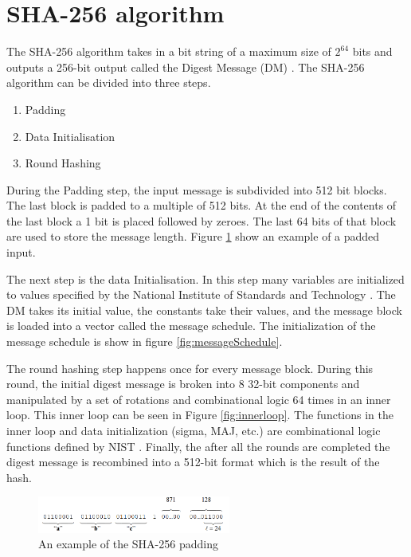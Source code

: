 \documentclass[conference]{IEEEtran}
\begin{document}
\section{SHA-256 algorithm} \label{sha256}
The SHA-256 algorithm takes in a bit string of a maximum size of $2^{64}$ bits and outputs a 256-bit output called the Digest Message (DM) \cite{nist}. The SHA-256 algorithm can be divided into three steps.
\begin{enumerate}
  \item Padding
  \item Data Initialisation
  \item Round Hashing
\end{enumerate}

During the Padding step, the input message is subdivided into 512 bit blocks. The last block is padded to a multiple of 512 bits. At the end of the contents of the last block a 1 bit is placed followed by zeroes. The last 64 bits of that block are used to store the message length. Figure \ref{fig:pad} show an example of a padded input. 

The next step is the data Initialisation. In this step many variables are initialized to values specified by the National Institute of Standards and Technology \cite{nist}. The DM takes its initial value, the constants take their values, and the message block is loaded into a vector called the message schedule. The initialization of the message schedule is show in figure \ref{fig:messageSchedule}. 

The round hashing step happens once for every message block. During this round, the initial digest message is broken into 8 32-bit components and manipulated by a set of rotations and combinational logic 64 times in an inner loop. This inner loop can be seen in Figure \ref{fig:innerloop}. The functions in the inner loop and data initialization (sigma, MAJ, etc.) are combinational logic functions defined by NIST \cite{nist}. Finally, the after all the rounds are completed the digest message is recombined into a 512-bit format which is the result of the hash.

\begin{figure}[!t]
\centering
\includegraphics[width=2.5in]{padding}
\caption{An example of the SHA-256 padding}
\label{fig:pad}
\end{figure}
\end{document}
